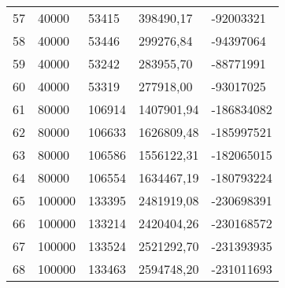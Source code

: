 \begin{longtable}{lllll}
    57               & 40000          & 53415          & 398490,17   & -92003321       \\
    58               & 40000          & 53446          & 299276,84   & -94397064       \\
    59               & 40000          & 53242          & 283955,70   & -88771991       \\
    60               & 40000          & 53319          & 277918,00   & -93017025       \\
    61               & 80000          & 106914         & 1407901,94  & -186834082      \\
    62               & 80000          & 106633         & 1626809,48  & -185997521      \\
    63               & 80000          & 106586         & 1556122,31  & -182065015      \\
    64               & 80000          & 106554         & 1634467,19  & -180793224      \\
    65               & 100000         & 133395         & 2481919,08  & -230698391      \\
    66               & 100000         & 133214         & 2420404,26  & -230168572      \\
    67               & 100000         & 133524         & 2521292,70  & -231393935      \\
    68               & 100000         & 133463         & 2594748,20  & -231011693      
\end{longtable}

